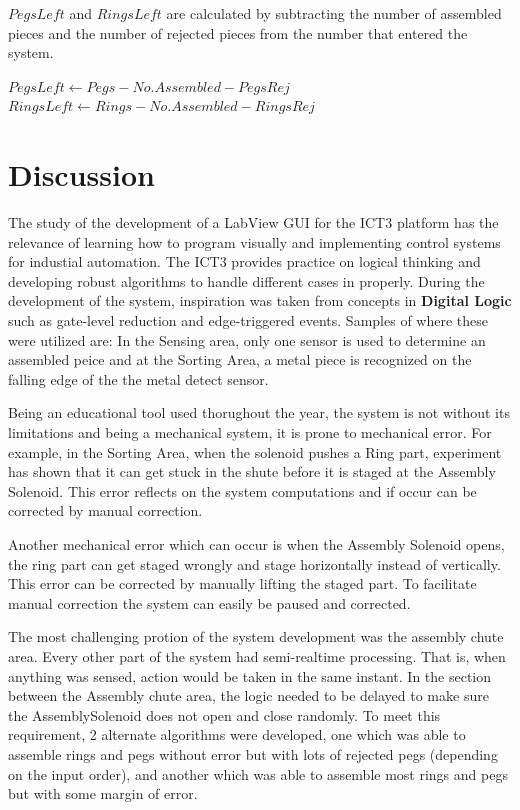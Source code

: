 \documentclass[12pt]{article}
\makeatletter
\newcommand*{\currentname}{\@currentlabelname}
\makeatother
\begin{document}
  $PegsLeft$ and $RingsLeft$ are calculated by subtracting the number of assembled pieces and the
  number of rejected pieces from the number that entered the system.

  \begin{algorithm}[H]
    \caption{\currentname}
    \begin{algorithmic}
        \STATE $PegsLeft \leftarrow Pegs - No.Assembled - PegsRej$
        \STATE $RingsLeft \leftarrow Rings - No.Assembled - RingsRej$
      \ENDWHILE
    \end{algorithmic}
  \end{algorithm}


\section{Discussion}
The study of the development of a LabView GUI for the ICT3 platform has the relevance of learning
how to program visually and implementing control systems for industial automation. The ICT3 provides
practice on logical thinking and developing robust algorithms to handle different cases in properly.
During the development of the system, inspiration was taken from concepts in \textbf{Digital Logic}
such as gate-level reduction and edge-triggered events. Samples of where these were utilized are:
In the Sensing area, only one sensor is used to determine an assembled peice and at
the Sorting Area, a metal piece is recognized on the falling edge of the the metal detect sensor.

Being an educational tool used thorughout the year, 
the system is not without its limitations and being a mechanical system,
it is prone to mechanical error. For example, in the Sorting Area, when the solenoid pushes a Ring
part, experiment has shown that it can get stuck in the shute before it is staged at the 
Assembly Solenoid. This error reflects on the system computations and if occur can be corrected by
manual correction.

Another mechanical error which can occur is when the Assembly Solenoid opens, the ring part can get
staged wrongly and stage horizontally instead of vertically. This error can be corrected by manually
lifting the staged part. To facilitate manual correction the system can easily be paused and corrected.

The most challenging protion of the system development was the assembly chute area. Every other part
of the system had semi-realtime processing. That is, when anything was sensed, action would be taken
in the same instant. In the section between the Assembly chute area, the logic needed to
be delayed to make sure the AssemblySolenoid does not open and close randomly.
To meet this requirement, 2 alternate algorithms were developed, one which was able to assemble 
rings and pegs without error but with lots of rejected pegs (depending on the input order), and another
which was able to assemble most rings and pegs but with some margin of error.
\end{document}
